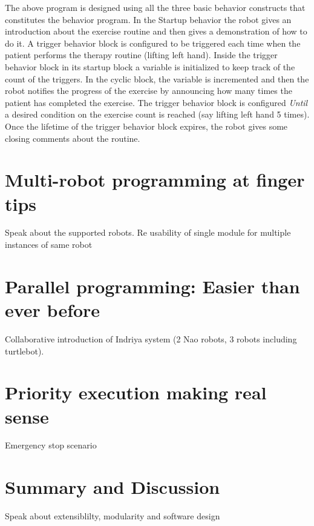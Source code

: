 The above program is designed using all the three basic behavior constructs that constitutes the behavior program. In the Startup behavior the robot gives an introduction about the exercise routine and then gives a demonstration of how to do it. A trigger behavior block is configured to be triggered each time when the patient performs the therapy routine (lifting left hand). Inside the trigger behavior block in its startup block a variable is initialized to keep track of the count of the triggers. In the cyclic block, the variable is incremented and then the robot notifies the progress of the exercise by announcing how many times the patient has completed the exercise. The trigger behavior block is configured \emph{Until} a desired condition on the exercise count is reached (say lifting left hand 5 times). Once the lifetime of the trigger behavior block expires, the robot gives some closing comments about the routine. 


\section{Multi-robot programming at finger tips}
Speak about the supported robots. Re usability of single module for multiple instances of same robot

\section{Parallel programming: Easier than ever before}
Collaborative introduction of Indriya system (2 Nao robots, 3 robots including turtlebot). 

\section{Priority execution making real sense}
Emergency stop scenario

\section{Summary and Discussion}

Speak about extensiblilty, modularity and software design